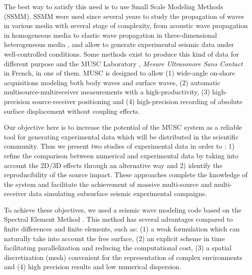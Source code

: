 \documentclass[manuscript,revised]{geophysics}
\begin{document}
\noindent The best way to satisfy this need is to use Small Scale Modeling Methods (SSMM). SSMM were used since several years to study the propagation of waves in various media with several stage of complexity, from acoustic wave propagation in homogeneous media to elastic wave propagation in three-dimensional heterogeneous media \citep{Rieber_EWP_1936,Howes_SMS_1953,Hilterman_TDM_1970,French_MRP_1974,Bishop_LVM_1985,Pratt_FWI_1999}, and allow to generate experimental seismic data under well-controlled conditions. Some methods exist to produce this kind of data for different purpose and the MUSC Laboratory \citep{Bretaudeau_SSA_2008b,Bretaudeau_SSM_2011,Bretaudeau_FWI_2013}, \textit{Mesure Ultrasonore Sans Contact} in French, in one of them. MUSC is designed to allow (1) wide-angle on-shore acquisitions modeling both body waves and surface waves, (2) automatic multisource-multireceiver measurements with a high-productivity, (3) high-precision source-receiver positioning and (4) high-precision recording of absolute surface displacement without coupling effects. 

\noindent Our objective here is to increase the potential of the MUSC system as a reliable tool for generating experimental data which will be distributed in the scientific community. 
\noindent Thus we present two studies of experimental data in order to : 1) refine the comparison between numerical and experimental data by taking into account the 2D/3D effects through an alternative way and 2) identify the reproducibility of the source impact. These approaches complete the knowledge of the system and facilitate the achievement of massive multi-source and multi-receiver data simulating subsurface seismic experimental campaigns.

\noindent To achieve these objectives, we used a seismic wave modeling code based on the Spectral Element Method \citep{Komatitsch_SEM_1998,Komatitsch_ISM_1999,Komatitsch_SEM_2005,Festa_PML_2005}. This method has several advantages compared to finite differences and finite elements, such as: (1) a weak formulation which can naturally take into account the free surface, (2) an explicit scheme in time facilitating parallelization and reducing the computational cost, (3) a spatial discretization (mesh) convenient for the representation of complex environments and (4) high precision results and low numerical dispersion.

\end{document}
